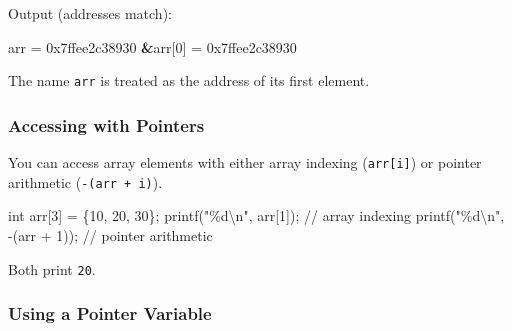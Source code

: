 \documentclass[
  letterpaper,
  DIV=11,
  numbers=noendperiod]{scrreprt}
\newenvironment{Shaded}{\begin{snugshade}}{\end{snugshade}}
\newcommand{\CommentTok}[1]{\textcolor[rgb]{0.37,0.37,0.37}{#1}}
\newcommand{\DataTypeTok}[1]{\textcolor[rgb]{0.68,0.00,0.00}{#1}}
\newcommand{\DecValTok}[1]{\textcolor[rgb]{0.68,0.00,0.00}{#1}}
\newcommand{\ExtensionTok}[1]{\textcolor[rgb]{0.00,0.23,0.31}{#1}}
\newcommand{\KeywordTok}[1]{\textcolor[rgb]{0.00,0.23,0.31}{\textbf{#1}}}
\newcommand{\NormalTok}[1]{\textcolor[rgb]{0.00,0.23,0.31}{#1}}
\newcommand{\OperatorTok}[1]{\textcolor[rgb]{0.37,0.37,0.37}{#1}}
\newcommand{\SpecialCharTok}[1]{\textcolor[rgb]{0.37,0.37,0.37}{#1}}
\newcommand{\StringTok}[1]{\textcolor[rgb]{0.13,0.47,0.30}{#1}}
\newcommand{\VariableTok}[1]{\textcolor[rgb]{0.07,0.07,0.07}{#1}}
\begin{document}
Output (addresses match):

\begin{Shaded}
\begin{Highlighting}[]
\ExtensionTok{arr}\NormalTok{ = 0x7ffee2c38930}
\KeywordTok{\&}\VariableTok{arr}\OperatorTok{[}\DecValTok{0}\OperatorTok{]} \ExtensionTok{=}\NormalTok{ 0x7ffee2c38930}
\end{Highlighting}
\end{Shaded}

The name \texttt{arr} is treated as the address of its first element.

\subsubsection{Accessing with Pointers}\label{accessing-with-pointers}

You can access array elements with either array indexing
(\texttt{arr{[}i{]}}) or pointer arithmetic (\texttt{-(arr\ +\ i)}).

\begin{Shaded}
\begin{Highlighting}[]
\DataTypeTok{int}\NormalTok{ arr}\OperatorTok{[}\DecValTok{3}\OperatorTok{]} \OperatorTok{=} \OperatorTok{\{}\DecValTok{10}\OperatorTok{,} \DecValTok{20}\OperatorTok{,} \DecValTok{30}\OperatorTok{\};}
\NormalTok{printf}\OperatorTok{(}\StringTok{"}\SpecialCharTok{\%d\textbackslash{}n}\StringTok{"}\OperatorTok{,}\NormalTok{ arr}\OperatorTok{[}\DecValTok{1}\OperatorTok{]);}       \CommentTok{// array indexing}
\NormalTok{printf}\OperatorTok{(}\StringTok{"}\SpecialCharTok{\%d\textbackslash{}n}\StringTok{"}\OperatorTok{,} \OperatorTok{{-}(}\NormalTok{arr }\OperatorTok{+} \DecValTok{1}\OperatorTok{));}   \CommentTok{// pointer arithmetic}
\end{Highlighting}
\end{Shaded}

Both print \texttt{20}.

\subsubsection{Using a Pointer Variable}\label{using-a-pointer-variable}
\end{document}
